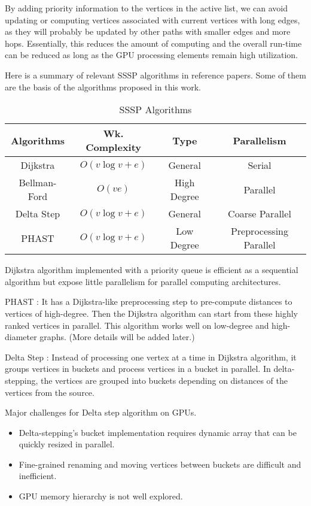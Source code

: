 By adding priority information to the vertices in the active list, we can avoid
updating or computing vertices associated with current vertices with long edges,
as they will probably be updated by other paths with smaller edges and more
hops. Essentially, this reduces the amount of computing and the overall run-time
can be reduced as long as the GPU processing elements remain high utilization.

Here is a summary of relevant SSSP algorithms in reference papers. Some of them
are the basis of the algorithms proposed in this work.
\begin{table}[!hbp]
    \begin{center}
    \begin{tabular}{cccc}
        \toprule[2pt]
         \textbf{Algorithms} & \textbf{Wk. Complexity} & \textbf{Type} &
         \textbf{Parallelism}\\
        \hline
        Dijkstra & $O(v\log{v}+e)$ & General & Serial \\
        Bellman-Ford & $O(ve)$ & High Degree & Parallel \\
        Delta Step & $O(v\log{v}+e)$ & General & Coarse Parallel \\
        PHAST & $O(v\log{v}+e)$ & Low Degree & Preprocessing Parallel \\
        \bottomrule[2pt]
    \end{tabular}
    \end{center}
    \caption{SSSP Algorithms}
\end{table} 

Dijkstra algorithm implemented with a priority queue is efficient as a
sequential algorithm but expose little parallelism for parallel computing
architectures.

PHAST \cite{delling2013phast}: It has a Dijkstra-like preprocessing step to pre-compute distances to
vertices of high-degree. Then the Dijkstra algorithm can start from these highly ranked
vertices in parallel. This algorithm works well on low-degree and high-diameter
graphs. (More details will be added later.)

Delta Step \cite{meyer2003delta}: Instead of processing one vertex at a time in
Dijkstra algorithm, it groups vertices in buckets and process vertices in a
bucket in parallel. In delta-stepping, the vertices are grouped into buckets
depending on distances of the vertices from the source.

Major challenges for Delta step algorithm on GPUs.
\begin{itemize}
    \item Delta-stepping's bucket implementation requires dynamic array that can
        be quickly resized in parallel.
    \item Fine-grained renaming and moving vertices between buckets are
        difficult and inefficient.
    \item GPU memory hierarchy is not well explored.
\end{itemize}

